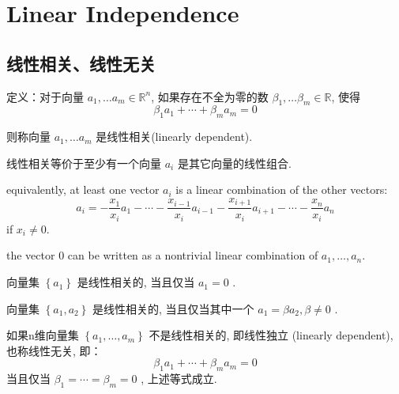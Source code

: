 \chapter{Linear Independence}

\section{线性相关、线性无关}

\begin{definition}
    定义：对于向量 $ a_{1}, \ldots a_{m} \in \mathbb{R}^{n} $, 如果存在不全为零的数 $ \beta_{1}, \ldots \beta_{m} \in \mathbb{R} $, 使得
$$
\beta_{1} a_{1}+\cdots+\beta_{m} a_{m}=0
$$

则称向量 $ a_{1}, \ldots a_{m} $ 是线性相关(linearly dependent). 
\end{definition}

\begin{corollary}
    线性相关等价于至少有一个向量 $ a_{i} $ 是其它向量的线性组合. 

    equivalently, at least one vector $ a_{i} $ is a linear combination of the other vectors:
$$
a_{i}=-\frac{x_{1}}{x_{i}} a_{1}-\cdots-\frac{x_{i-1}}{x_{i}} a_{i-1}-\frac{x_{i+1}}{x_{i}} a_{i+1}-\cdots-\frac{x_{n}}{x_{i}} a_{n}
$$
if $ x_{i} \neq 0 $.
\end{corollary}


\begin{corollary}
    the vector 0 can be written as a nontrivial linear combination of $ a_{1}, \ldots, a_{n} $.
\end{corollary}


\begin{corollary}
    向量集 $ \left\{a_{1}\right\} $ 是线性相关的, 当且仅当 $ a_{1}=0 $ . 
\end{corollary}
\begin{corollary}
    向量集 $ \left\{a_{1}, a_{2}\right\} $ 是线性相关的,  当且仅当其中一个 $ a_{1}=\beta a_{2}, \beta \neq 0 $ . 
\end{corollary}

\begin{definition}
    \label{Def:LinearIndependence}
    如果n维向量集 $ \left\{a_{1}, \ldots, a_{m}\right\} $ 不是线性相关的, 即线性独立 (linearly dependent), 也称线性无关,  即：
$$
\beta_{1} a_{1}+\cdots+\beta_{m} a_{m}=0
$$
当且仅当 $ \beta_{1}=\cdots=\beta_{m}=0 $ , 上述等式成立. 
\end{definition}

